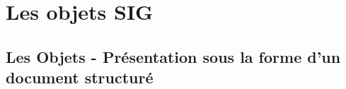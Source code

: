\documentclass[12pt,titlepage,oneside]{book}
\begin{document}
\chapter{Les objets SIG}



\section{Les Objets - Présentation sous la forme d'un document structuré}

\vspace{\baselineskip}

\end{document}

